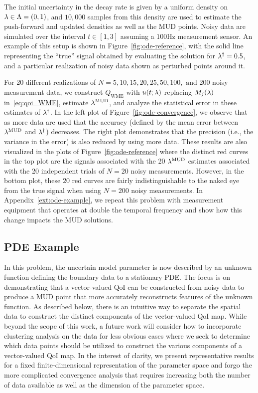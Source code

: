 The initial uncertainty in the decay rate is given by a uniform density on $\lambda \in \Lambda = (0, 1)$, and $10,000$ samples from this density are used to estimate the push-forward and updated densities as well as the MUD points.
Noisy data are simulated over the interval $t \in [1,3]$ assuming a $100$Hz measurement sensor.
An example of this setup is shown in Figure~\ref{fig:ode-reference}, with the solid line representing the ``true'' signal obtained by evaluating the solution for $\lambda^\dagger = 0.5$, and a particular realization of noisy data shown as perturbed points around it.

For 20 different realizations of $N=5, 10, 15, 20, 25, 50, 100, \text{ and } 200$ noisy measurement data, we construct $Q_\text{WME}$ with $u(t;\lambda)$ replacing $M_j(\lambda)$ in~\eqref{eq:qoi_WME}, estimate $\lambda^{\text{MUD}}$, and analyze the statistical error in these estimates of $\lambda^\dagger$.
In the left plot of Figure~\ref{fig:ode-convergence}, we observe that as more data are used that the accuracy (defined by the mean error between $\lambda^{\text{MUD}}$ and $\lambda^\dagger$) decreases.
The right plot demonstrates that the precision (i.e., the variance in the error) is also reduced by using more data.
These results are also visualized in the plots of Figure~\ref{fig:ode-reference} where the distinct red curves in the top plot are the signals associated with the 20 $\lambda^{\text{MUD}}$ estimates associated with the 20 independent trials of $N=20$ noisy measurements.
However, in the bottom plot, these $20$ red curves are fairly indistinguishable to the naked eye from the true signal when using $N=200$ noisy measurements.
In Appendix~\ref{ext:ode-example}, we repeat this problem with measurement equipment that operates at double the temporal frequency and show how this change impacts the MUD solutions.

\subsection{PDE Example}\label{subsec:pde-example}

In this problem, the uncertain model parameter is now described by an unknown function defining the boundary data to a stationary PDE.
The focus is on demonstrating that a vector-valued QoI can be constructed from noisy data to produce a MUD point that more accurately reconstructs features of the unknown function.
As described below, there is an intuitive way to separate the spatial data to construct the distinct components of the vector-valued QoI map.
While beyond the scope of this work, a future work will consider how to incorporate clustering analysis on the data for less obvious cases where we seek to determine which data points should be utilized to construct the various components of a vector-valued QoI map.
In the interest of clarity, we present representative results for a fixed finite-dimensional representation of the parameter space and forgo the more complicated convergence analysis that requires increasing both the number of data available as well as the dimension of the parameter space.

